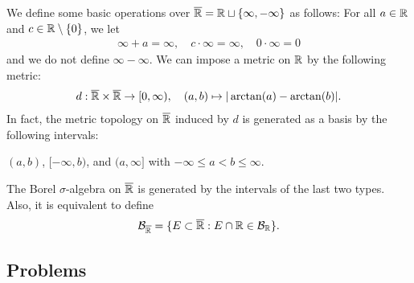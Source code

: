 \begin{exmp}
    We define some basic operations over $\overline{{\mathbb{R}}}={\mathbb{R}}\sqcup\{\infty, -\infty\}$ as follows: For all $a\in{\mathbb{R}}$ and $c\in{\mathbb{R}}\setminus\{0\}$, we let
    \begin{align*}
        \infty+a=\infty,\quad c\cdot\infty=\infty,\quad 0\cdot\infty=0
    \end{align*}
    and we do not define $\infty-\infty$.
    We can impose a metric on ${\mathbb{R}}$ by the following metric:
    \begin{align*}
        d: \overline{{\mathbb{R}}}\times\overline{{\mathbb{R}}}\rightarrow[0, \infty),\quad(a, b)\mapsto|\arctan(a)-\arctan(b)|.
    \end{align*}
    In fact, the metric topology on $\overline{{\mathbb{R}}}$ induced by $d$ is generated as a basis by the following intervals:
    \begin{center}
        $(a, b)$, $[-\infty, b)$, and $(a, \infty]$ with $-\infty\leq a<b\leq\infty$.
    \end{center}
    The Borel $\sigma$-algebra on $\overline{{\mathbb{R}}}$ is generated by the intervals of the last two types.
    Also, it is equivalent to define
    \begin{align*}
        {\mathcal{B}}_{\overline{{\mathbb{R}}}}=\{
            E\subset\overline{{\mathbb{R}}}
            :
            E\cap{\mathbb{R}}\in{\mathcal{B}}_{{\mathbb{R}}}
        \}.
    \end{align*}
\end{exmp}

\subsection*{Problems}

